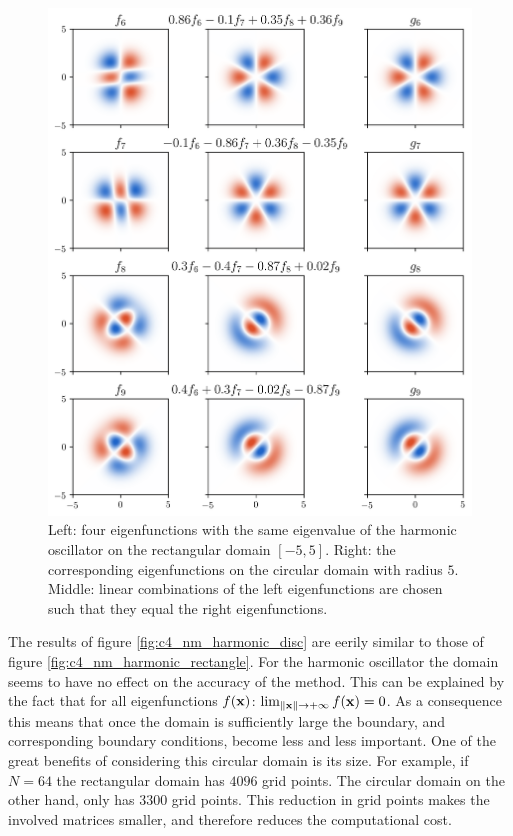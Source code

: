 \begin{figure}
    \begin{center}
        \includegraphics[width=\textwidth]{img/chapter4/nm_test_harmonic_eigenfunctions.png}
    \end{center}
    \caption{Left: four eigenfunctions with the same eigenvalue of the harmonic oscillator on the rectangular domain $[-5, 5]$. Right: the corresponding eigenfunctions on the circular domain with radius $5$. Middle: linear combinations of the left eigenfunctions are chosen such that they equal the right eigenfunctions.}
    \label{fig:c4_nm_harmonic_eigenfunctions}
\end{figure}

The results of figure \ref{fig:c4_nm_harmonic_disc} are eerily similar to those of figure \ref{fig:c4_nm_harmonic_rectangle}. For the harmonic oscillator the domain seems to have no effect on the accuracy of the method. This can be explained by the fact that for all eigenfunctions $f(\vb{x})$: $\lim_{\|\vb{x}\| \to +\infty} f(\vb{x}) = 0$. As a consequence this means that once the domain is sufficiently large the boundary, and corresponding boundary conditions, become less and less important. One of the great benefits of considering this circular domain is its size. For example, if $N = 64$ the rectangular domain has $4096$ grid points. The circular domain on the other hand, only has $3300$ grid points. This reduction in grid points makes the involved matrices smaller, and therefore reduces the computational cost.

